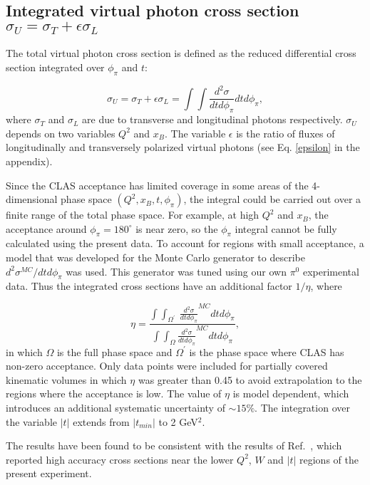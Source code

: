 \documentclass[prc,floatfix,twocolumn,superscriptaddress,letter]{revtex4}
\begin{document}
\subsection{Integrated virtual photon cross section  $\sigma_U=\sigma_{T}+\epsilon\sigma_L$}
The total virtual photon cross section  is defined as the  reduced differential cross section  integrated over $\phi_\pi$ and $t$:

\begin{equation}
\sigma_{U}=\sigma_T+\epsilon\sigma_L=\int \int  \frac{d^2 \sigma}{ dt d\phi_\pi} dt  d\phi_\pi,
\end{equation}
\noindent
where $\sigma_T$ and $\sigma_L$ are due to transverse and longitudinal photons respectively. $\sigma_U$ depends on two variables $Q^2$ and $x_B$. The variable $\epsilon$ is the ratio of fluxes of longitudinally and transversely polarized virtual photons (see Eq. \ref{epsilon} in the appendix).

Since the CLAS acceptance has limited coverage  in some areas of the 4-dimensional phase space $(Q^2,x_B,t,\phi_\pi)$, the integral could be carried out over a finite range of the total phase space.  For example, at high $Q^2$ and $x_B$, the acceptance around  $\phi_\pi=180^\circ$ is near zero, so the $\phi_\pi$ integral cannot be fully calculated using the present data.
 To account for regions with small acceptance, a model that was developed for the Monte Carlo generator to describe $d^2 \sigma^{MC}/ dt d\phi_\pi$  was used.
This generator was  tuned using our own $\pi^0$ experimental data. 
Thus the integrated cross sections have an additional factor  $1/\eta$, where

\begin{equation}
\eta=\frac{\int \int_{\Omega^\prime} \ \frac{d^2 \sigma}{ dt d\phi_\pi}^{MC} dt  d\phi_\pi}{\int\int _{\Omega}\frac{d^2 \sigma}{ dt d\phi_\pi}^{MC} dt  d\phi_\pi}, 
\end{equation}
\noindent
in which  $\Omega$ is the full phase space and $\Omega^\prime$ is the phase space where CLAS has non-zero acceptance.
Only data points were included for partially covered kinematic volumes in which 
 $\eta$ was  greater than 0.45  to avoid extrapolation to the regions where the acceptance is low.  
The  value of $\eta$ is model dependent, which introduces an additional systematic uncertainty of $\sim 15\%$. 
The integration over the variable $|t|$  extends from  $|t_{min}|$  to 2 GeV$^2$.  

The results have been found to be consistent with the results 
of Ref.~\cite{Hall-A-pi0}, which reported  high  accuracy cross sections 
near the lower $Q^2$, $W$ and $|t|$ regions of the present experiment. 
\end{document}
